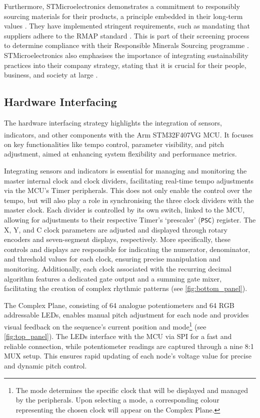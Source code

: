 \documentclass[12pt]{article}
\numberwithin{subsubsubsection}{subsubsection}
\begin{document}
 Furthermore, STMicroelectronics demonstrates a commitment to responsibly sourcing materials for their products, a principle embedded in their long-term values \cite{STM1}. They have implemented stringent requirements, such as mandating that suppliers adhere to the RMAP standard \cite{STM2}. This is part of their screening process to determine compliance with their Responsible Minerals Sourcing programme \cite{STM2}. STMicroelectronics also emphasises the importance of integrating sustainability practices into their company strategy, stating that it is crucial for their people, business, and society at large \cite{STM3}. 

\subsection{Hardware Interfacing}
\label{appendix:hardwareinterfacing}

The hardware interfacing strategy highlights the integration of sensors, indicators, and other components with the Arm\textsuperscript{\textregistered} STM32F407VG MCU. It focuses on key functionalities like tempo control, parameter visibility, and pitch adjustment, aimed at enhancing system flexibility and performance metrics.

Integrating sensors and indicators is essential for managing and monitoring the master internal clock and clock dividers, facilitating real-time tempo adjustments via the MCU's Timer peripherals. This does not only enable the control over the tempo, but will also play a role in synchronising the three clock dividers with the master clock. Each divider is controlled by its own switch, linked to the MCU, allowing for adjustments to their respective Timer's `prescaler' (\texttt{PSC}) register. 
\newpage
The X, Y, and C clock parameters are adjusted and displayed through rotary encoders and seven-segment displays, respectively. More specifically, these controls and displays are responsible for indicating the numerator, denominator, and threshold values for each clock, ensuring precise manipulation and monitoring. Additionally, each clock associated with the recurring decimal algorithm features a dedicated gate output and a summing gate mixer, facilitating the creation of complex rhythmic patterns (see \autoref{fig:bottom_panel}).

The Complex Plane, consisting of 64 analogue potentiometers and 64 RGB addressable LEDs, enables manual pitch adjustment for each node and provides visual feedback on the sequence's current position and mode\footnote{The mode determines the specific clock that will be displayed and managed by the peripherals. Upon selecting a mode, a corresponding colour representing the chosen clock will appear on the Complex Plane.} (see \autoref{fig:top_panel}). The LEDs interface with the MCU via SPI for a fast and reliable connection, while potentiometer readings are captured through a nine 8:1 MUX setup. This ensures rapid updating of each node's voltage value for precise and dynamic pitch control.
\end{document}
